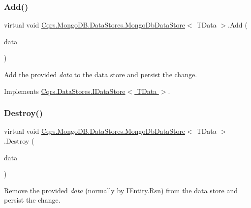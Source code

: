\subsubsection{\texorpdfstring{Add()}{Add()}\hspace{0.1cm}{\footnotesize\ttfamily [2/2]}}
{\footnotesize\ttfamily virtual void \hyperlink{classCqrs_1_1MongoDB_1_1DataStores_1_1MongoDbDataStore}{Cqrs.\+Mongo\+D\+B.\+Data\+Stores.\+Mongo\+Db\+Data\+Store}$<$ T\+Data $>$.Add (\begin{DoxyParamCaption}\item[{I\+Enumerable$<$ T\+Data $>$}]{data }\end{DoxyParamCaption})\hspace{0.3cm}{\ttfamily [virtual]}}



Add the provided {\itshape data}  to the data store and persist the change. 



Implements \hyperlink{interfaceCqrs_1_1DataStores_1_1IDataStore_a906f3f2f80db7a549a4170eca4653e26_a906f3f2f80db7a549a4170eca4653e26}{Cqrs.\+Data\+Stores.\+I\+Data\+Store$<$ T\+Data $>$}.

\mbox{\label{classCqrs_1_1MongoDB_1_1DataStores_1_1MongoDbDataStore_a4650c780f34e320ba39f312e3b04555d_a4650c780f34e320ba39f312e3b04555d}} 
\subsubsection{\texorpdfstring{Destroy()}{Destroy()}}
{\footnotesize\ttfamily virtual void \hyperlink{classCqrs_1_1MongoDB_1_1DataStores_1_1MongoDbDataStore}{Cqrs.\+Mongo\+D\+B.\+Data\+Stores.\+Mongo\+Db\+Data\+Store}$<$ T\+Data $>$.Destroy (\begin{DoxyParamCaption}\item[{T\+Data}]{data }\end{DoxyParamCaption})\hspace{0.3cm}{\ttfamily [virtual]}}



Remove the provided {\itshape data}  (normally by I\+Entity.\+Rsn) from the data store and persist the change. 



